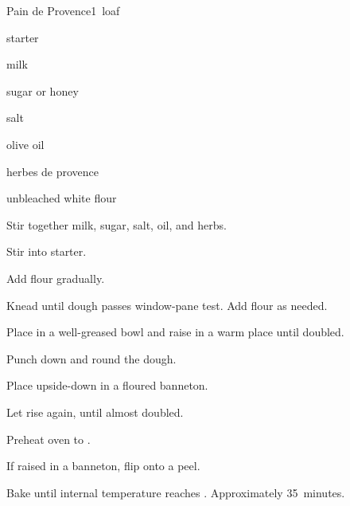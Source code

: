 \begin{recipe}{Pain de Provence}{}{1~loaf}

\begin{ingredients}
\item {} starter
\item \C{\half} milk
\item {} sugar or honey
\item {} salt
\item {} olive oil
\item {} herbes de provence
\item {} unbleached white flour
\end{ingredients}

\begin{directions}
\item Stir together milk, sugar, salt, oil, and herbs.
\item Stir into starter.
\item Add flour gradually.
\item Knead until dough passes window-pane test. Add flour as needed.
\item Place in a well-greased bowl and raise in a warm place until doubled.
\item Punch down and round the dough.
\item Place upside-down in a floured banneton.
\item Let rise again, until almost doubled.
\item Preheat oven to .
\item If raised in a banneton, flip onto a peel.
\item Bake until internal temperature reaches . Approximately 35~minutes.
\end{directions}

\end{recipe}
